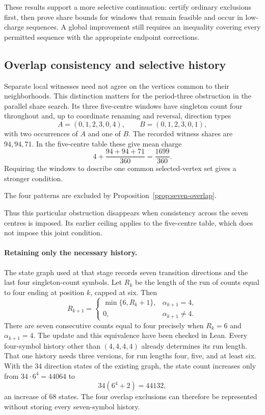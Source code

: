\documentclass[11pt,a4paper]{article}
\theoremstyle{definition}
\theoremstyle{remark}
\begin{document}
These results support a more selective continuation: certify ordinary exclusions first, then prove share bounds for windows that remain feasible and occur in low-charge sequences. A global improvement still requires an inequality covering every permitted sequence with the appropriate endpoint corrections.

\subsection{Overlap consistency and selective history}
Separate local witnesses need not agree on the vertices common to their neighborhoods. This distinction matters for the period-three obstruction in the parallel share search. Its three five-centre windows have singleton count four throughout and, up to coordinate renaming and reversal, direction types
\[
A=(0,1,2,3,0,4),\qquad B=(0,1,2,3,0,1),
\]
with two occurrences of $A$ and one of $B$. The recorded witness shares are $94,94,71$. In the five-centre table these give mean charge
\[
4+\frac{94+94+71}{360}=\frac{1699}{360}.
\]
Requiring the windows to describe one common selected-vertex set gives a stronger condition.

The four patterns are excluded by Proposition~\ref{prop:seven-overlap}.


Thus this particular obstruction disappears when consistency across the seven centres is imposed. Its earlier ceiling applies to the five-centre table, which does not impose this joint condition.

\paragraph{Retaining only the necessary history.}
The state graph used at that stage records seven transition directions and the last four singleton-count symbols. Let $R_k$ be the length of the run of counts equal to four ending at position $k$, capped at six. Then
\[
R_{k+1}=\begin{cases}
\min\{6,R_k+1\},&\alpha_{k+1}=4,\\
0,&\alpha_{k+1}\ne4.
\end{cases}
\]
There are seven consecutive counts equal to four precisely when $R_k=6$ and $\alpha_{k+1}=4$. The update and this equivalence have been checked in Lean. Every four-symbol history other than $(4,4,4,4)$ already determines its run length. That one history needs three versions, for run lengths four, five, and at least six. With the 34 direction states of the existing graph, the state count increases only from $34\cdot6^4=44064$ to
\[
34(6^4+2)=44132,
\]
an increase of 68 states. The four overlap exclusions can therefore be represented without storing every seven-symbol history.
\end{document}
